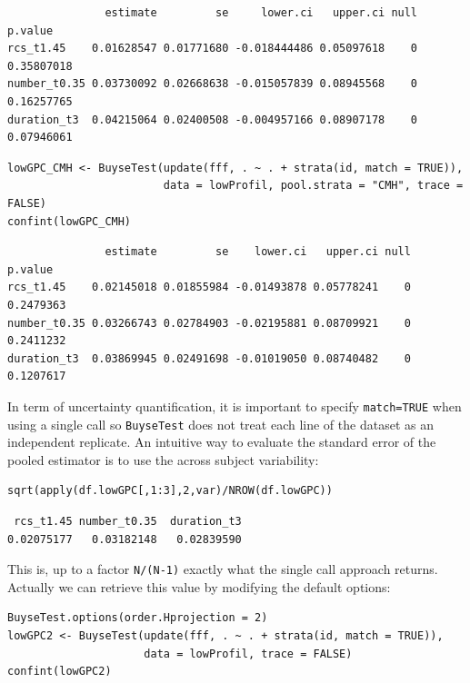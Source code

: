 \documentclass[12pt]{article}
\begin{document}
\begin{verbatim}
               estimate         se     lower.ci   upper.ci null    p.value
rcs_t1.45    0.01628547 0.01771680 -0.018444486 0.05097618    0 0.35807018
number_t0.35 0.03730092 0.02668638 -0.015057839 0.08945568    0 0.16257765
duration_t3  0.04215064 0.02400508 -0.004957166 0.08907178    0 0.07946061
\end{verbatim}


\lstset{language=r,label= ,caption= ,captionpos=b,numbers=none}
\begin{lstlisting}
lowGPC_CMH <- BuyseTest(update(fff, . ~ . + strata(id, match = TRUE)),
                        data = lowProfil, pool.strata = "CMH", trace = FALSE)
confint(lowGPC_CMH)
\end{lstlisting}

\begin{verbatim}
               estimate         se    lower.ci   upper.ci null   p.value
rcs_t1.45    0.02145018 0.01855984 -0.01493878 0.05778241    0 0.2479363
number_t0.35 0.03266743 0.02784903 -0.02195881 0.08709921    0 0.2411232
duration_t3  0.03869945 0.02491698 -0.01019050 0.08740482    0 0.1207617
\end{verbatim}


\clearpage

In term of uncertainty quantification, it is important to specify
\texttt{match=TRUE} when using a single call so \texttt{BuyseTest} does not treat
each line of the dataset as an independent replicate. An intuitive way
to evaluate the standard error of the pooled estimator is to use the
across subject variability:
\lstset{language=r,label= ,caption= ,captionpos=b,numbers=none}
\begin{lstlisting}
sqrt(apply(df.lowGPC[,1:3],2,var)/NROW(df.lowGPC))
\end{lstlisting}

\begin{verbatim}
 rcs_t1.45 number_t0.35  duration_t3 
0.02075177   0.03182148   0.02839590
\end{verbatim}


\noindent This is, up to a factor \texttt{N/(N-1)} exactly what the single call
approach returns. Actually we can retrieve this value by modifying the default options:
\lstset{language=r,label= ,caption= ,captionpos=b,numbers=none}
\begin{lstlisting}
BuyseTest.options(order.Hprojection = 2)
lowGPC2 <- BuyseTest(update(fff, . ~ . + strata(id, match = TRUE)),
                     data = lowProfil, trace = FALSE)
confint(lowGPC2)
\end{lstlisting}
\end{document}
